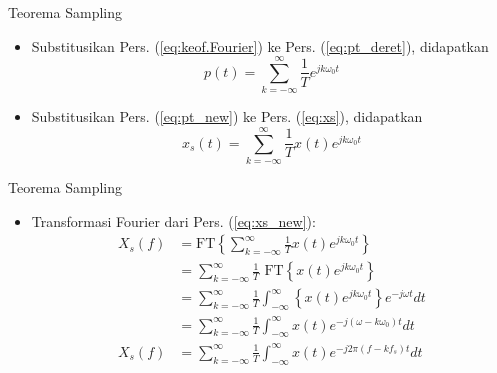 \documentclass[pdflatex,compress,mathserif]{beamer}
\begin{document}
\begin{frame}{Teorema Sampling}
    \begin{itemize}
        \item Substitusikan Pers. (\ref{eq:keof.Fourier}) ke Pers. (\ref{eq:pt_deret}), didapatkan
        \begin{equation}
            p(t) = \sum_{k = -\infty}^{\infty} \frac{1}{T} e^{jk\omega_0t}
            \label{eq:pt_new}
        \end{equation}
        \item Substitusikan Pers. (\ref{eq:pt_new}) ke Pers. (\ref{eq:xs}), didapatkan
        \begin{equation}
            x_s(t) = \sum_{k = -\infty}^{\infty} \frac{1}{T} x(t) e^{jk\omega_0t}
            \label{eq:xs_new}
        \end{equation}
    \end{itemize}
\end{frame}

\begin{frame}{Teorema Sampling}
    \begin{itemize}
        \item Transformasi Fourier dari Pers. (\ref{eq:xs_new}):
        \begin{align}
            X_s(f) &= \text{FT} \left\{ \sum_{k = -\infty}^{\infty} \frac{1}{T} x(t) e^{jk\omega_0t} \right\} \\
            &= \sum_{k = -\infty}^{\infty} \frac{1}{T} \text{ FT} \left\{ x(t) e^{jk\omega_0t} \right\} \\
            &= \sum_{k = -\infty}^{\infty} \frac{1}{T} \int_{-\infty}^{\infty} \left\{ x(t) e^{jk\omega_0t} \right\}e^{-j\omega t} dt\\
            &= \sum_{k = -\infty}^{\infty} \frac{1}{T} \int_{-\infty}^{\infty} x(t) e^{-j(\omega-k\omega_0) t} dt \\
            X_s(f) &= \sum_{k = -\infty}^{\infty} \frac{1}{T} \int_{-\infty}^{\infty} x(t) e^{-j2\pi(f-kf_s) t} dt
            \label{eq:Xsf}
        \end{align}
    \end{itemize}
\end{frame}
\end{document}
